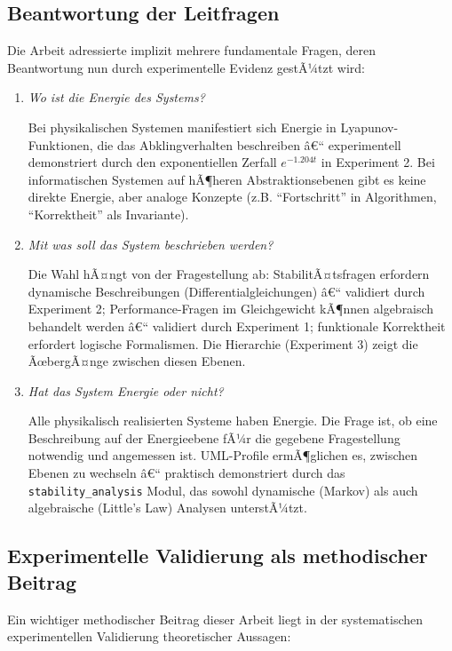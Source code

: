 ﻿\documentclass[a4paper,12pt]{report}
\theoremstyle{definition}
\begin{document}
\subsection{Beantwortung der Leitfragen}

Die Arbeit adressierte implizit mehrere fundamentale Fragen, deren Beantwortung nun durch experimentelle Evidenz gestÃ¼tzt wird:

\begin{enumerate}
	\item[-] \textit{Wo ist die Energie des Systems?} 
	
	Bei physikalischen Systemen manifestiert sich Energie in Lyapunov-Funktionen, die das Abklingverhalten beschreiben â€“ experimentell demonstriert durch den exponentiellen Zerfall $e^{-1.204t}$ in Experiment 2. Bei informatischen Systemen auf hÃ¶heren Abstraktionsebenen gibt es keine direkte Energie, aber analoge Konzepte (z.B. ``Fortschritt'' in Algorithmen, ``Korrektheit'' als Invariante).
	
	\item[-] \textit{Mit was soll das System beschrieben werden?}
	
	Die Wahl hÃ¤ngt von der Fragestellung ab: StabilitÃ¤tsfragen erfordern dynamische Beschreibungen (Differentialgleichungen) â€“ validiert durch Experiment 2; Performance-Fragen im Gleichgewicht kÃ¶nnen algebraisch behandelt werden â€“ validiert durch Experiment 1; funktionale Korrektheit erfordert logische Formalismen. Die Hierarchie (Experiment 3) zeigt die ÃœbergÃ¤nge zwischen diesen Ebenen.
	
	\item[-] \textit{Hat das System Energie oder nicht?}
	
	Alle physikalisch realisierten Systeme haben Energie. Die Frage ist, ob eine Beschreibung auf der Energieebene fÃ¼r die gegebene Fragestellung notwendig und angemessen ist. UML-Profile ermÃ¶glichen es, zwischen Ebenen zu wechseln â€“ praktisch demonstriert durch das \texttt{stability\_analysis} Modul, das sowohl dynamische (Markov) als auch algebraische (Little's Law) Analysen unterstÃ¼tzt.
\end{enumerate}

\subsection{Experimentelle Validierung als methodischer Beitrag}

Ein wichtiger methodischer Beitrag dieser Arbeit liegt in der systematischen experimentellen Validierung theoretischer Aussagen:
\end{document}
